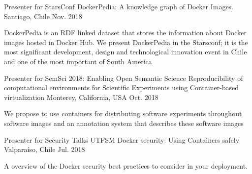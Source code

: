 \begin{cventries}
  \cventry
    {Presenter for StarsConf}
    {DockerPedia: A knowledge graph of Docker Images.}
    {Santiago, Chile}
    {Nov. 2018}
    {
      \begin{cvitems}
        \item {DockerPedia is an RDF linked dataset that stores the information about Docker images hosted in Docker Hub. We present DockerPedia in the Starsconf; it is the most significant development, design and technological innovation event in Chile and one of the most important of South America}
      \end{cvitems}
    }

 \cventry
    {Presenter for SemSci 2018: Enabling Open Semantic Science}
    {Reproducibility of computational environments for Scientific Experiments using Container-based virtualization}
    {Monterey, California, USA}
    {Oct. 2018}
    {
      \begin{cvitems}
        \item {We propose to use containers for  distributing  software  experiments throughout software images and an annotation system that describes these software images}
        \end{cvitems}
    }    



    
  \cventry
    {Presenter for Security Talks UTFSM}
    {Docker security: Using Containers safely}
    {Valparaíso, Chile}
    {Jul. 2018}
    {
      \begin{cvitems}
        \item {A overview of the Docker security best practices to consider in your deployment.}
      \end{cvitems}
    }    
\end{cventries}
